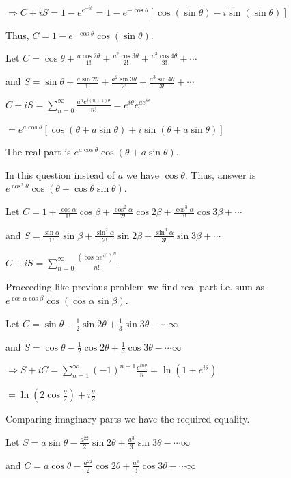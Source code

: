   $\Rightarrow C + iS = 1 - e^{e^{-i\theta}} = 1 - e^{-\cos\theta}[\cos(\sin\theta) - i\sin(\sin\theta)]$

  Thus, $C = 1 - e^{-\cos\theta}\cos(\sin\theta)$.
\item Let $C = \cos\theta + \frac{a\cos2\theta}{1!} + \frac{a^2\cos3\theta}{2!} +
  \frac{a^3\cos4\theta}{3!} + \cdots$

  and $S = \sin\theta + \frac{a\sin2\theta}{1!} + \frac{a^2\sin3\theta}{2!} +
  \frac{a^3\sin4\theta}{3!} + \cdots$

  $C + iS = \displaystyle\sum_{n = 0}^\infty \frac{a^ne^{i(n + 1)\theta}}{n!} = e^{i\theta}e^{ae^{i\theta}}$

  $= e^{a\cos\theta}[\cos(\theta + a\sin\theta) + i\sin(\theta + a\sin\theta)]$

  The real part is $e^{a\cos\theta}\cos(\theta + a\sin\theta)$.
\item In this question instead of $a$ we have $\cos\theta$. Thus, answer is $e^{\cos^2\theta}\cos(\theta +
  \cos\theta\sin\theta)$.
\item Let $C = 1 + \frac{\cos\alpha}{1!}\cos\beta + \frac{\cos^2\alpha}{2!}\cos2\beta +
  \frac{\cos^3\alpha}{3!}\cos3\beta + \cdots$

  and $S = \frac{\sin\alpha}{1!}\sin\beta + \frac{\sin^2\alpha}{2!}\sin2\beta +
  \frac{\sin^3\alpha}{3!}\sin3\beta + \cdots$

  $C + iS = \displaystyle\sum_{n = 0}^\infty\frac{\left(\cos\alpha e^{i\beta}\right)^n}{n!}$

  Proceeding like previous problem we find real part i.e. sum as
  $e^{\cos\alpha\cos\beta}\cos(\cos\alpha\sin\beta)$.
\item Let $C = \sin\theta - \frac{1}{2}\sin2\theta + \frac{1}{3}\sin3\theta - \cdots \infty$

  and $S = \cos\theta - \frac{1}{2}\cos2\theta + \frac{1}{3}\cos3\theta - \cdots \infty$

  $\Rightarrow S + iC = \displaystyle\sum_{n = 1}^\infty (-1)^{n + 1}\frac{e^{in\theta}}{n} = \ln\left(1 +
  e^{i\theta}\right)$

  $= \ln\left(2\cos\frac{\theta}{2}\right) + i\frac{\theta}{2}$

  Comparing imaginary parts we have the required equality.
\item Let $S = a\sin\theta - \frac{a^22}{2}\sin2\theta + \frac{a^3}{3}\sin3\theta - \cdots \infty$

  and $C = a\cos\theta - \frac{a^22}{2}\cos2\theta + \frac{a^3}{3}\cos3\theta - \cdots \infty$


